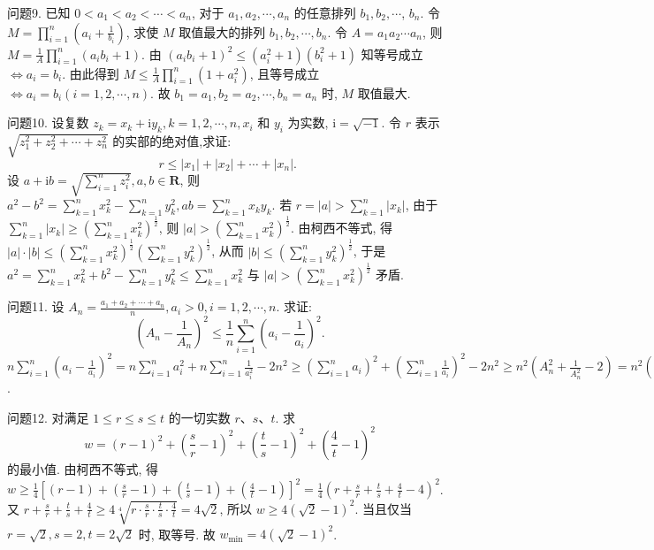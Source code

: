 问题9. 已知 $0<a_1<a_2<\cdots<a_n$, 对于 $a_1, a_2, \cdots, a_n$ 的任意排列 $b_1, b_2, \cdots$, $b_n$. 令 $M=\prod_{i=1}^n\left(a_i+\frac{1}{b_i}\right)$, 求使 $M$ 取值最大的排列 $b_1, b_2, \cdots, b_n$.
令 $A=a_1 a_2 \cdots a_n$, 则 $M=\frac{1}{A} \prod_{i=1}^n\left(a_i b_i+1\right)$. 由 $\left(a_i b_i+1\right)^2 \leqslant\left(a_i^2+1\right) \left(b_i^2+1\right)$ 知等号成立 $\Leftrightarrow a_i=b_i$. 由此得到 $M \leqslant \frac{1}{A} \prod_{i=1}^n\left(1+a_i^2\right)$, 且等号成立 $\Leftrightarrow a_i=b_i(i=1,2, \cdots, n)$. 故 $b_1=a_1, b_2=a_2, \cdots, b_n=a_n$ 时, $M$ 取值最大.



问题10. 设复数 $z_k=x_k+\mathrm{i} y_k, k=1,2, \cdots, n, x_i$ 和 $y_i$ 为实数, $\mathrm{i}=\sqrt{-1}$. 令 $r$ 表示 $\sqrt{z_1^2+z_2^2+\cdots+z_n^2}$ 的实部的绝对值,求证:
$$
r \leqslant\left|x_1\right|+\left|x_2\right|+\cdots+\left|x_n\right| \text {. }
$$
设 $a+\mathrm{i} b=\sqrt{\sum_{i=1}^n z_i^2}, a, b \in \mathbf{R}$, 则 $a^2-b^2=\sum_{k=1}^n x_k^2-\sum_{k=1}^n y_k^2, a b= \sum_{k=1}^n x_k y_k$. 若 $r=|a|>\sum_{k=1}^n\left|x_k\right|$, 由于 $\sum_{k=1}^n\left|x_k\right| \geqslant\left(\sum_{k=1}^n x_k^2\right)^{\frac{1}{2}}$, 则 $|a|> \left(\sum_{k=1}^n x_k^2\right)^{\frac{1}{2}}$. 由柯西不等式, 得 $|a| \cdot|b| \leqslant\left(\sum_{k=1}^n x_k^2\right)^{\frac{1}{2}}\left(\sum_{k=1}^n y_k^2\right)^{\frac{1}{2}}$, 从而 $|b| \leqslant \left(\sum_{k=1}^n y_k^2\right)^{\frac{1}{2}}$, 于是 $a^2=\sum_{k=1}^n x_k^2+b^2-\sum_{k=1}^n y_k^2 \leqslant \sum_{k=1}^n x_k^2$ 与 $|a|>\left(\sum_{k=1}^n x_k^2\right)^{\frac{1}{2}}$ 矛盾.



问题11. 设 $A_n=\frac{a_1+a_2+\cdots+a_n}{n}, a_i>0, i=1,2, \cdots, n$. 求证:
$$
\left(A_n-\frac{1}{A_n}\right)^2 \leqslant \frac{1}{n} \sum_{i=1}^n\left(a_i-\frac{1}{a_i}\right)^2 .
$$
$n \sum_{i=1}^n\left(a_i-\frac{1}{a_i}\right)^2=n \sum_{i=1}^n a_i^2+n \sum_{i=1}^n \frac{1}{a_i^2}-2 n^2 \geqslant\left(\sum_{i=1}^n a_i\right)^2+\left(\sum_{i=1}^n \frac{1}{a_i}\right)^2- 2 n^2 \geqslant n^2\left(A_n^2+\frac{1}{A_n^2}-2\right)=n^2\left(A_n-\frac{1}{A_n}\right)^2$.



问题12. 对满足 $1 \leqslant r \leqslant s \leqslant t$ 的一切实数 $r 、 s 、 t$. 求
$$
w=(r-1)^2+\left(\frac{s}{r}-1\right)^2+\left(\frac{t}{s}-1\right)^2+\left(\frac{4}{t}-1\right)^2
$$
的最小值.
由柯西不等式, 得 $w \geqslant \frac{1}{4}\left[(r-1)+\left(\frac{s}{r}-1\right)+\left(\frac{t}{s}-1\right)+\left(\frac{4}{t}-1\right)\right]^2 =\frac{1}{4}\left(r+\frac{s}{r}+\frac{t}{s}+\frac{4}{t}-4\right)^2$. 又 $r+\frac{s}{r}+\frac{t}{s}+\frac{4}{t} \geqslant 4 \sqrt[4]{r \cdot \frac{s}{r} \cdot \frac{t}{s} \cdot \frac{4}{t}}= 4 \sqrt{2}$, 所以 $w \geqslant 4(\sqrt{2}-1)^2$. 当且仅当 $r=\sqrt{2}, s=2, t=2 \sqrt{2}$ 时, 取等号.
故 $w_{\min }=4(\sqrt{2}-1)^2$.



